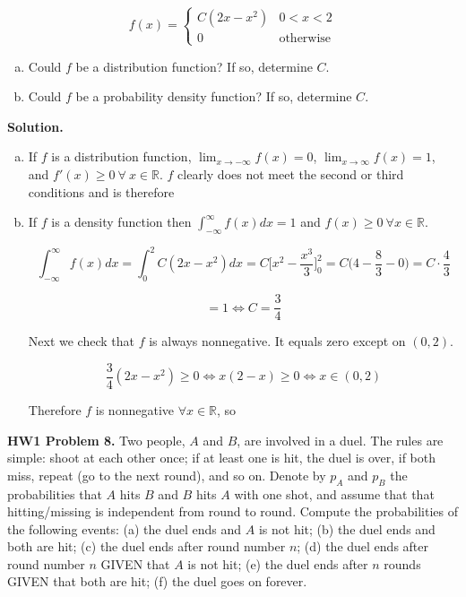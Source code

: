\[
f(x) = \begin{cases}
C(2x - x^2) & 0 < x < 2 \\
0 & \text{otherwise}
\end{cases}
\]

\begin{enumerate}[(a)]

\item Could \(f\) be a distribution function? If so, determine \(C\).

\item Could \(f\) be a probability density function? If so, determine \(C\).

\end{enumerate}

\textbf{Solution.} 

\begin{enumerate}[(a)]

\item If \(f\) is a distribution function, \(\lim_{x \to -\infty} f(x) = 0\), \(\lim_{x \to \infty} f(x) = 1\), and \(f'(x) \geq 0 \ \forall \ x \in \mathbb{R}\). \(f\) clearly does not meet the second or third conditions and is therefore 

\item If \(f\) is a density function then \(\int_{-\infty}^{\infty} f(x) dx = 1\) and \(f(x) \geq 0 \ \forall x \in \mathbb{R}\). 

\[
\int_{-\infty}^{\infty} f(x) dx = \int_{0}^2 C(2x - x^2) dx = C \bigg[ x^2 - \frac{x^3}{3}\bigg]_0^2 = C \bigg( 4 - \frac{8}{3} - 0\bigg) = C \cdot \frac{4}{3} 
\]

\[
= 1 \iff C = \frac{3}{4}
\]

Next we check that \(f\) is always nonnegative. It equals zero except on \((0, 2)\). 

\[
\frac{3}{4}(2x -  x^2) \geq 0 \iff x(2 - x) \geq 0 \iff x \in (0, 2)
\]

Therefore \(f\) is nonnegative \(\forall x \in \mathbb{R}\), so 

\end{enumerate}


\textbf{HW1 Problem 8.} Two people, \(A\) and \(B\), are involved in a duel. The rules are simple: shoot at each other once; if at least one is hit, the duel is over, if both miss, repeat (go to the next round), and so on. Denote by \(p_A\) and \(p_B\) the probabilities that \(A\) hits \(B\) and \(B\) hits \(A\) with one shot, and assume that that hitting/missing is independent from round to round. Compute the probabilities of the following events: (a) the duel ends and \(A\) is not hit; (b) the duel ends and both are hit; (c) the duel ends after round number \(n\); (d) the duel ends after round number \(n\) GIVEN that \(A\) is not hit; (e) the duel ends after \(n\) rounds GIVEN that both are hit; (f) the duel goes on forever.

